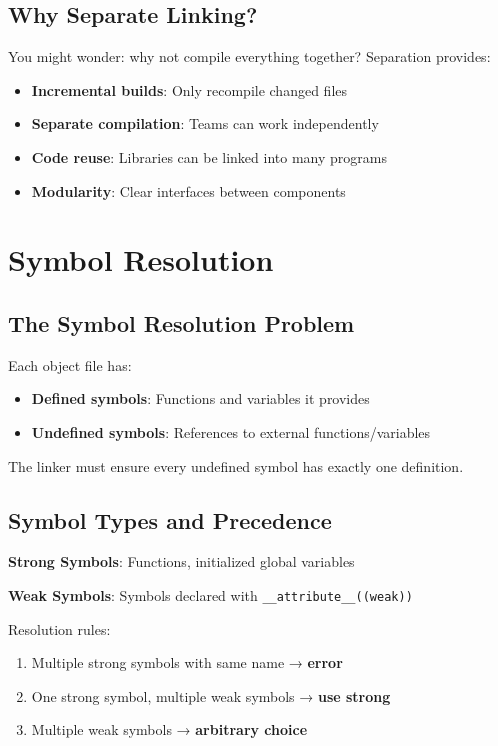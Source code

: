 \subsection{Why Separate Linking?}

You might wonder: why not compile everything together? Separation provides:
\begin{itemize}
    \item \textbf{Incremental builds}: Only recompile changed files
    \item \textbf{Separate compilation}: Teams can work independently
    \item \textbf{Code reuse}: Libraries can be linked into many programs
    \item \textbf{Modularity}: Clear interfaces between components
\end{itemize}

\section{Symbol Resolution}

\subsection{The Symbol Resolution Problem}

Each object file has:
\begin{itemize}
    \item \textbf{Defined symbols}: Functions and variables it provides
    \item \textbf{Undefined symbols}: References to external functions/variables
\end{itemize}

The linker must ensure every undefined symbol has exactly one definition.

\subsection{Symbol Types and Precedence}

\textbf{Strong Symbols}: Functions, initialized global variables

\textbf{Weak Symbols}: Symbols declared with \texttt{\_\_attribute\_\_((weak))}

Resolution rules:
\begin{enumerate}
    \item Multiple strong symbols with same name → \textbf{error}
    \item One strong symbol, multiple weak symbols → \textbf{use strong}
    \item Multiple weak symbols → \textbf{arbitrary choice}
\end{enumerate}


